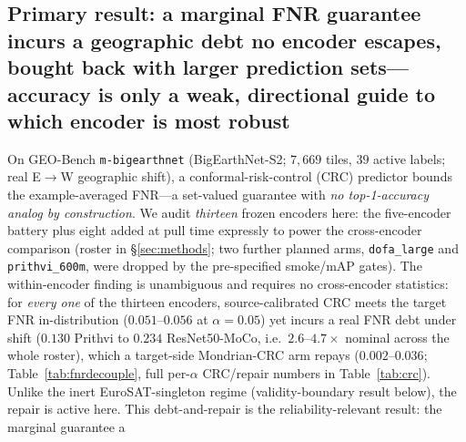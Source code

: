 \documentclass[11pt]{article}
\begin{document}
\subsection*{Primary result: a marginal FNR guarantee incurs a geographic debt no encoder escapes, bought back with larger prediction sets---accuracy is only a weak, directional guide to which encoder is most robust}
On GEO-Bench \texttt{m-bigearthnet} (BigEarthNet-S2; $7{,}669$ tiles, $39$ active labels; real E$\to$W
geographic shift), a conformal-risk-control (CRC) predictor \citep{angelopoulos2024crc} bounds the
example-averaged FNR---a set-valued guarantee with \emph{no top-1-accuracy analog by construction}.
We audit \emph{thirteen} frozen encoders here: the five-encoder battery plus eight added at pull time
expressly to power the cross-encoder comparison (roster in \S\ref{sec:methods}; two further planned arms,
\texttt{dofa\_large} and \texttt{prithvi\_600m}, were dropped by the pre-specified smoke/mAP gates).
The within-encoder finding is unambiguous and requires no cross-encoder statistics: for \emph{every one}
of the thirteen encoders, source-calibrated CRC meets the target FNR in-distribution ($0.051$--$0.056$ at
$\alpha{=}0.05$) yet incurs a real FNR debt under shift ($0.130$ Prithvi to $0.234$ ResNet50-MoCo, i.e.\
$2.6$--$4.7\times$ nominal across the whole roster), which a target-side Mondrian-CRC arm repays
($0.002$--$0.036$; Table~\ref{tab:fnrdecouple}, full per-$\alpha$ CRC/repair numbers in
Table~\ref{tab:crc}). Unlike the inert EuroSAT-singleton regime (validity-boundary result below), the
repair is active here. This debt-and-repair is the reliability-relevant result: the marginal guarantee a
\end{document}
